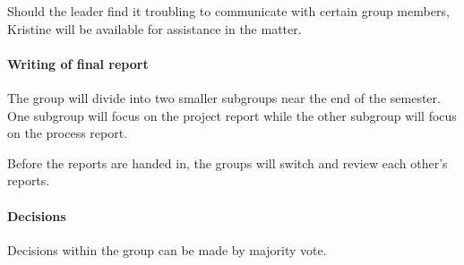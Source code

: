 \documentclass[a4paper, oneside, fleqn]{scrartcl}
\begin{document}
Should the leader find it troubling to communicate with certain group members, Kristine will be available for assistance in the matter.

\paragraph{Writing of final report}
The group will divide into two smaller subgroups near the end of the semester. One subgroup will focus on the project report while the other subgroup will focus on the process report.

Before the reports are handed in, the groups will switch and review each other's reports.

\paragraph{Decisions}
Decisions within the group can be made by majority vote.
\end{document}
